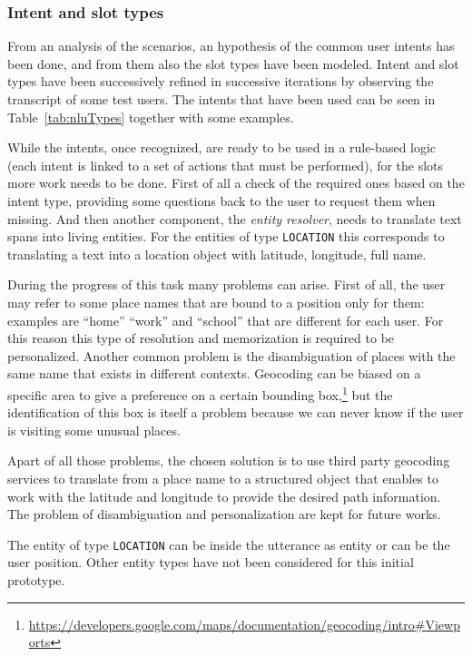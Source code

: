 \subsubsection{Intent and slot types}
\label{approachTypes}

From an analysis of the scenarios, an hypothesis of the common user intents has been done, and from them also the slot types have been modeled. Intent and slot types have been successively refined in successive iterations by observing the transcript of some test users.
The intents that have been used can be seen in Table~\ref{tab:nluTypes} together with some examples.



While the intents, once recognized, are ready to be used in a rule-based logic (each intent is linked to a set of actions that must be performed), for the slots more work needs to be done. First of all a check of the required ones based on the intent type, providing some questions back to the user to request them when missing. And then another component, the \textit{entity resolver}, needs to translate text spans into living entities. For the entities of type \texttt{LOCATION} this corresponds to translating a text into a location object with latitude, longitude, full name.

During the progress of this task many problems can arise. First of all, the user may refer to some place names that are bound to a position only for them: examples are ``home'' ``work'' and ``school'' that are different for each user. For this reason this type of resolution and memorization is required to be personalized. Another common problem is the disambiguation of places with the same name that exists in different contexts. Geocoding can be biased on a specific area to give a preference on a certain bounding box,\footnote{\url{https://developers.google.com/maps/documentation/geocoding/intro\#Viewports}} but the identification of this box is itself a problem because we can never know if the user is visiting some unusual places.

Apart of all those problems, the chosen solution is to use third party geocoding services to translate from a place name to a structured object that enables to work with the latitude and longitude to provide the desired path information. The problem of disambiguation and personalization are kept for future works.

The entity of type \texttt{LOCATION} can be inside the utterance as entity or can be the user position. Other entity types have not been considered for this initial prototype.

